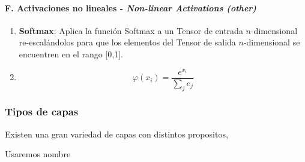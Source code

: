 \paragraph*{F. Activaciones no lineales - \textit{Non-linear Activations (other)} \cite{pytorch2024github}}

\begin{enumerate}
    \item \textbf{Softmax}: Aplica la función Softmax a un Tensor de entrada $n$-dimensional re-escalándolos para que los elementos del Tensor de salida $n$-dimensional se encuentren en el rango [0,1]. \cite{pytorch2024github}
    \item[] \begin{equation} \varphi(x_{i}) = \frac{e^{x_{i}}}{\sum_{j}{e_{j}}} \end{equation}
\end{enumerate}



\subsubsection{Tipos de capas}



Existen una gran variedad de capas con distintos propositos,

Usaremos nombre

